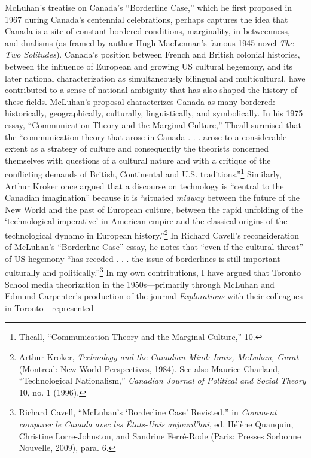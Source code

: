 \documentclass{tufte-handout}
\begin{document}
McLuhan's treatise on Canada's ``Borderline Case,'' which he first
proposed in 1967 during Canada's centennial celebrations, perhaps
captures the idea that Canada is a site of constant bordered conditions,
marginality, in-betweenness, and dualisms (as framed by author Hugh
MacLennan's famous 1945 novel \emph{The Two Solitudes}). Canada's
position between French and British colonial histories, between the
influence of European and growing US cultural hegemony, and its later
national characterization as simultaneously bilingual and multicultural,
have contributed to a sense of national ambiguity that has also shaped
the history of these fields. McLuhan's proposal characterizes Canada as
many-bordered: historically, geographically, culturally, linguistically,
and symbolically. In his 1975 essay, ``Communication Theory and the
Marginal Culture,'' Theall surmised that the ``communication theory that
arose in Canada . . . arose to a considerable extent as a strategy of
culture and consequently the theorists concerned themselves with
questions of a cultural nature and with a critique of the conflicting
demands of British, Continental and U.S. traditions.''\footnote{Theall,
  ``Communication Theory and the Marginal Culture,'' 10.} Similarly,
Arthur Kroker once argued that a discourse on technology is ``central to
the Canadian imagination'' because it is ``situated \emph{midway}
between the future of the New World and the past of European culture,
between the rapid unfolding of the `technological imperative' in
American empire and the classical origins of the technological dynamo in
European history.''\footnote{Arthur Kroker, \emph{Technology and the
  Canadian Mind: Innis, McLuhan, Grant} (Montreal: New World
  Perspectives, 1984). See also Maurice Charland, ``Technological
  Nationalism,'' \emph{Canadian Journal of Political and Social Theory}
  10, no. 1 (1996).} In Richard Cavell's reconsideration of McLuhan's
``Borderline Case'' essay, he notes that ``even if the cultural threat''
of US hegemony ``has receded . . . the issue of borderlines is still
important culturally and politically.''\footnote{Richard Cavell,
  ``McLuhan's `Borderline Case' Revisted,'' in \emph{Comment comparer le
  Canada avec les États-Unis aujourd'hui}, ed. Hélène Quanquin,
  Christine Lorre-Johnston, and Sandrine Ferré-Rode (Paris: Presses
  Sorbonne Nouvelle, 2009), para. 6.} In my own contributions, I have
argued that Toronto School media theorization in the 1950s---primarily
through McLuhan and Edmund Carpenter's production of the journal
\emph{Explorations} with their colleagues in Toronto---represented
\end{document}
